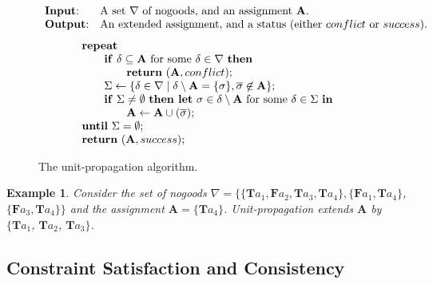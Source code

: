 \documentclass{tlp}
\newtheorem{example}{Example}
\newcommand{\assignment}{\mathbf{A}}
\newcommand{\tass}[1]{\mathbf{T}#1}
\newcommand{\fass}[1]{\mathbf{F}#1}
\begin{document}
\begin{figure}
\figrule
\[
\begin{array}{ll}
$\textbf{Input}:$ & $A set $\nabla$ of nogoods, and an assignment $\assignment$.$\\
$\textbf{Output}:$ & $An extended assignment, and a status (either $conflict$ or $success$).$\\
\end{array}
\]
\[
\begin{array}{l}
$\textbf{repeat}$\\
\qquad$\textbf{if} $\delta \subseteq \assignment $ for some $ \delta \in \nabla $ \textbf{then}$\\
\qquad\qquad$\textbf{return} $(\assignment,conflict)$;$\\
\qquad\Sigma\leftarrow\{\delta\in\nabla\mid\delta\setminus\assignment=\{\sigma\},\overline{\sigma}\not\in\assignment\}$;$\\
\qquad$\textbf{if} $\Sigma\neq\emptyset$ \textbf{then let} $\sigma\in\delta\setminus\assignment$ for some $\delta\in\Sigma$ \textbf{in}$\\
\qquad\qquad\assignment\leftarrow\assignment\cup(\overline{\sigma})$;$\\
$\textbf{until} $\Sigma=\emptyset $;$\\
$\textbf{return} $(\assignment,success)$;$
\end{array}
\]
\figrule
\vspace{-1\baselineskip}
\caption{The unit-propagation algorithm.}\label{alg:up}
\end{figure}
\begin{example}
Consider the set of nogoods $\nabla = \{ \{\tass{a_1}, \fass{a_2}, \tass{a_3}, \tass{a_4}\}, \{\fass{a_1}, \tass{a_4}\}$, $\{\fass{a_3}, \tass{a_4}\} \}$ and the assignment $\assignment = \{\tass{a_4}\}$. Unit-propagation extends $\assignment$ by $\{\tass{a_1}$, $\tass{a_2}$, $\tass{a_3}\}$.
\end{example}


\subsection{Constraint Satisfaction and Consistency}
\end{document}
